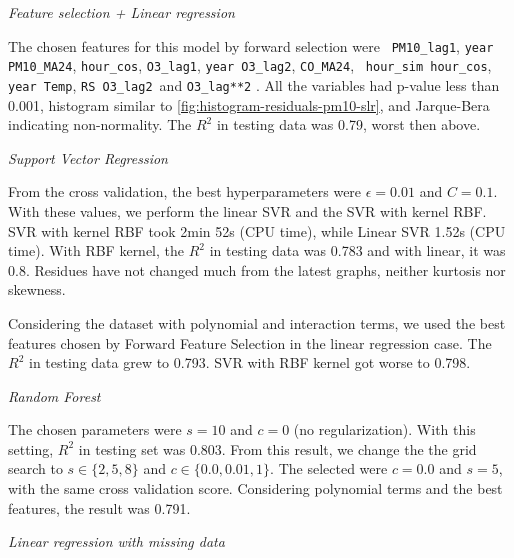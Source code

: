 \vspace{2mm}

{\em Feature selection + Linear regression}

\vspace{2mm}

The chosen features for this model by forward selection were {\tt
PM10\_lag1}, {\tt year PM10\_MA24},
{\tt hour\_cos}, {\tt O3\_lag1}, {\tt year O3\_lag2}, {\tt CO\_MA24}, {\tt
hour\_sim hour\_cos}, {\tt year Temp}, {\tt RS O3\_lag2}\ and {\tt O3\_lag**2}
. All the variables had p-value less than 0.001, histogram similar to
\ref{fig:histogram-residuals-pm10-slr}, and Jarque-Bera indicating non-normality.
The $R^2$ in testing data was 0.79, worst then above.

\vspace{2mm}

{\em Support Vector Regression}

\vspace{2mm}

From the cross validation, the best hyperparameters were
$\epsilon = 0.01$ and $C = 0.1$. With these values, we perform the linear SVR and
the SVR with kernel RBF. SVR with kernel RBF took 2min 52s (CPU time), while Linear SVR 1.52s (CPU time). With RBF kernel, the $R^2$ in testing data was 0.783 and
with linear, it was 0.8. Residues have not changed much from the latest graphs, neither kurtosis nor skewness.

Considering the dataset with polynomial and interaction terms, we used the
best features chosen by Forward Feature Selection in the linear regression case. The
$R^2$ in testing data grew to 0.793. SVR with RBF kernel got worse to 0.798. 

\vspace{2mm}

{\em Random Forest} 

\vspace{2mm}

The chosen parameters were $s = 10$ and $c = 0$ (no regularization).
With this setting, $R^2$ in testing set was 0.803. From this result, we change
the the grid search to $s \in
\{2, 5, 8\}$ and $c \in \{0.0, 0.01, 1\}$. The selected were $c =
0.0$ and $s = 5$, with the same cross validation score. Considering
polynomial terms and the best features, the result was 0.791. 

\vspace{2mm}

{\em Linear regression with missing data} 

